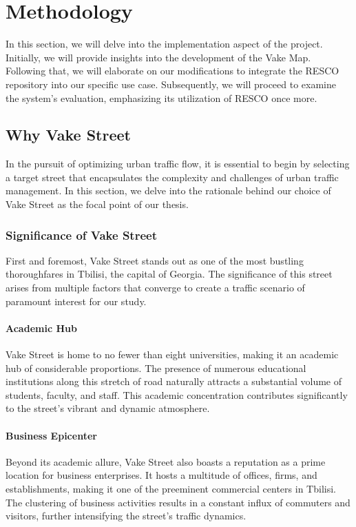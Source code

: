 \chapter{Methodology}
In this section, we will delve into the implementation aspect of the project. Initially, we will provide insights into the development of the Vake Map. Following that, we will elaborate on our modifications to integrate the RESCO repository into our specific use case. Subsequently, we will proceed to examine the system's evaluation, emphasizing its utilization of RESCO once more.

\section{Why Vake Street} \label{sec:why-vake}
In the pursuit of optimizing urban traffic flow, it is essential to begin by selecting a target street that encapsulates the complexity and challenges of urban traffic management. In this section, we delve into the rationale behind our choice of Vake Street as the focal point of our thesis.

\subsection{Significance of Vake Street}
First and foremost, Vake Street stands out as one of the most bustling thoroughfares in Tbilisi, the capital of Georgia. The significance of this street arises from multiple factors that converge to create a traffic scenario of paramount interest for our study.

\subsubsection{Academic Hub}
Vake Street is home to no fewer than eight universities, making it an academic hub of considerable proportions. The presence of numerous educational institutions along this stretch of road naturally attracts a substantial volume of students, faculty, and staff. This academic concentration contributes significantly to the street's vibrant and dynamic atmosphere.

\subsubsection{Business Epicenter}
Beyond its academic allure, Vake Street also boasts a reputation as a prime location for business enterprises. It hosts a multitude of offices, firms, and establishments, making it one of the preeminent commercial centers in Tbilisi. The clustering of business activities results in a constant influx of commuters and visitors, further intensifying the street's traffic dynamics.

